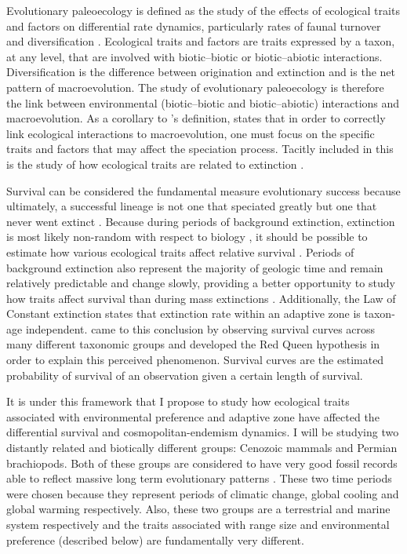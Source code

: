\documentclass[12pt,letterpaper]{article}
\begin{document}
Evolutionary paleoecology is defined as the study of the effects of ecological traits and factors on differential rate dynamics, particularly rates of faunal turnover and diversification \citep{Kitchell1985a}. Ecological traits and factors are traits expressed by a taxon, at any level, that are involved with biotic--biotic or biotic--abiotic interactions. Diversification is the difference between origination and extinction and is the net pattern of macroevolution. The study of evolutionary paleoecology is therefore the link between environmental (biotic--biotic and biotic--abiotic) interactions and macroevolution. As a corollary to \citet{Kitchell1985a}'s definition, \citet{Allmon1994} states that in order to correctly link ecological interactions to macroevolution, one must focus on the specific traits and factors that may affect the speciation process. Tacitly included in this is the study of how ecological traits are related to extinction \citep{Kitchell1990}.

Survival can be considered the fundamental measure evolutionary success because ultimately, a successful lineage is not one that speciated greatly but one that never went extinct \citep{Cooper1984,Palmer2012}. Because during periods of background extinction, extinction is most likely non-random with respect to biology \citep{Jablonski1986}, it should be possible to estimate how various ecological traits affect relative survival \citep{Kitchell1990,Kitchell1985a}. Periods of background extinction also represent the majority of geologic time and remain relatively predictable and change slowly, providing a better opportunity to study how traits affect survival than during mass extinctions \citep{Jablonski1986,Raup1988}. Additionally, the Law of Constant extinction \citep{VanValen1973} states that extinction rate within an adaptive zone is taxon-age independent. \citet{VanValen1973} came to this conclusion by observing survival curves across many different taxonomic groups and developed the Red Queen hypothesis in order to explain this perceived phenomenon. Survival curves are the estimated probability of survival of an observation given a certain length of survival.

It is under this framework that I propose to study how ecological traits associated with environmental preference and adaptive zone have affected the differential survival and cosmopolitan-endemism dynamics. I will be studying two distantly related and biotically different groups: Cenozoic mammals and Permian brachiopods. Both of these groups are considered to have very good fossil records able to reflect massive long term evolutionary patterns \citep{Mark1977}. These two time periods were chosen because they represent periods of climatic change, global cooling and global warming respectively. Also, these two groups are a terrestrial and marine system respectively and the traits associated with range size and environmental preference (described below) are fundamentally very different. 
\end{document}
